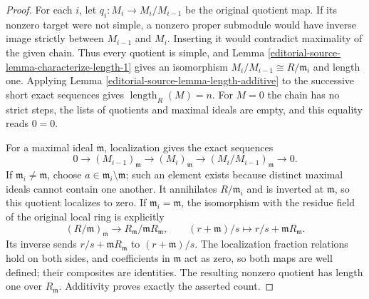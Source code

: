 \begin{proof}
For each $i$, let $q_i:M_i\to M_i/M_{i-1}$ be the original
quotient map. If its nonzero target were not simple, a nonzero
proper submodule would have inverse image strictly between
$M_{i-1}$ and $M_i$. Inserting it would contradict maximality
of the given chain. Thus every quotient is simple, and
Lemma \ref{editorial-source-lemma-characterize-length-1} gives an isomorphism
$M_i/M_{i-1}\cong R/\mathfrak m_i$ and length one.
Applying Lemma \ref{editorial-source-lemma-length-additive} to the successive
short exact sequences gives $\operatorname{length}_R(M)=n$.
For $M=0$ the chain has no strict steps, the lists of quotients
and maximal ideals are empty, and this equality reads $0=0$.

For a maximal ideal $\mathfrak m$, localization gives the exact sequences
$$
0\longrightarrow(M_{i-1})_{\mathfrak m}
\longrightarrow(M_i)_{\mathfrak m}
\longrightarrow(M_i/M_{i-1})_{\mathfrak m}
\longrightarrow0.
$$
If $\mathfrak m_i\neq\mathfrak m$, choose
$a\in\mathfrak m_i\setminus\mathfrak m$; such an element exists
because distinct maximal ideals cannot contain one another.
It annihilates $R/\mathfrak m_i$ and is inverted at
$\mathfrak m$, so this quotient localizes to zero.
If $\mathfrak m_i=\mathfrak m$, the isomorphism with the
residue field of the original local ring is explicitly
$$
(R/\mathfrak m)_{\mathfrak m}
\longrightarrow R_{\mathfrak m}/\mathfrak mR_{\mathfrak m},
\qquad
(r+\mathfrak m)/s\longmapsto r/s+\mathfrak mR_{\mathfrak m}.
$$
Its inverse sends $r/s+\mathfrak mR_{\mathfrak m}$ to
$(r+\mathfrak m)/s$. The localization fraction relations hold
on both sides, and coefficients in $\mathfrak m$ act as zero,
so both maps are well defined; their composites are identities.
The resulting nonzero quotient has length one over $R_{\mathfrak m}$.
Additivity proves exactly the asserted count.


\end{proof}
